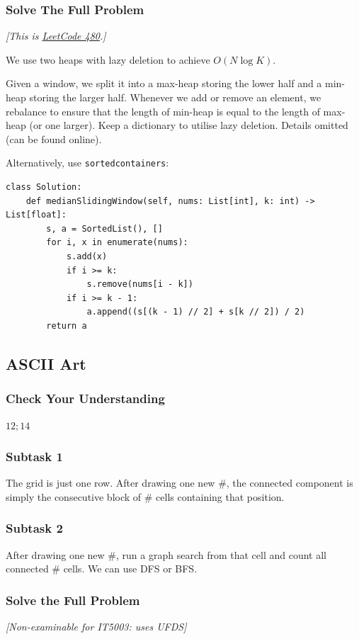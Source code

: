 \documentclass[12pt]{article}
\renewcommand{\t}{\texttt}
\begin{document}
\subsubsection{Solve The Full Problem}
\textit{[This is \href{https://leetcode.com/problems/sliding-window-median/description/}{LeetCode 480}.]}

We use two heaps with lazy deletion to achieve $O(N\log K)$.

Given a window, we split it into a max-heap storing the lower half and a min-heap storing the larger half. Whenever we add or remove an element, we rebalance to ensure that the length of min-heap is equal to the length of max-heap (or one larger). Keep a dictionary to utilise lazy deletion. Details omitted (can be found online).

Alternatively, use \t{sortedcontainers}:
\begin{verbatim}
class Solution:
    def medianSlidingWindow(self, nums: List[int], k: int) -> List[float]:
        s, a = SortedList(), []
        for i, x in enumerate(nums):
            s.add(x)
            if i >= k:
                s.remove(nums[i - k])
            if i >= k - 1:
                a.append((s[(k - 1) // 2] + s[k // 2]) / 2)
        return a
\end{verbatim}
\subsection{ASCII Art}
\subsubsection{Check Your Understanding}
$12; 14$
\subsubsection{Subtask 1}
The grid is just one row. After drawing one new \#, the connected component is simply the consecutive block of \# cells containing that position.
\subsubsection{Subtask 2}
After drawing one new \#, run a graph search from that cell and count all connected \# cells. We can use DFS or BFS.
\subsubsection{Solve the Full Problem}
\textit{[Non-examinable for IT5003: uses UFDS]}
\end{document}
